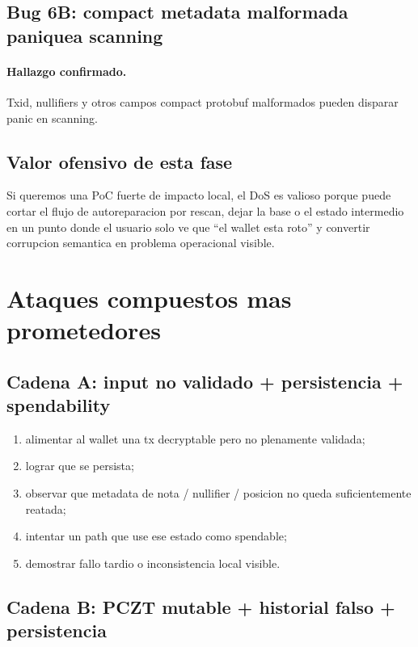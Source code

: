 \documentclass[11pt,a4paper]{article}
\begin{document}
\subsection{Bug 6B: compact metadata malformada paniquea scanning}

\paragraph{Hallazgo confirmado.}
Txid, nullifiers y otros campos compact protobuf malformados pueden disparar
panic en scanning.

\subsection{Valor ofensivo de esta fase}

Si queremos una PoC fuerte de impacto local, el DoS es valioso porque puede
cortar el flujo de autoreparacion por rescan, dejar la base o el estado
intermedio en un punto donde el usuario solo ve que ``el wallet esta roto'' y
convertir corrupcion semantica en problema operacional visible.

\section{Ataques compuestos mas prometedores}

\subsection{Cadena A: input no validado + persistencia + spendability}

\begin{enumerate}[leftmargin=2em]
    \item alimentar al wallet una tx decryptable pero no plenamente validada;
    \item lograr que se persista;
    \item observar que metadata de nota / nullifier / posicion no queda
    suficientemente reatada;
    \item intentar un path que use ese estado como spendable;
    \item demostrar fallo tardio o inconsistencia local visible.
\end{enumerate}

\subsection{Cadena B: PCZT mutable + historial falso + persistencia}
\end{document}
